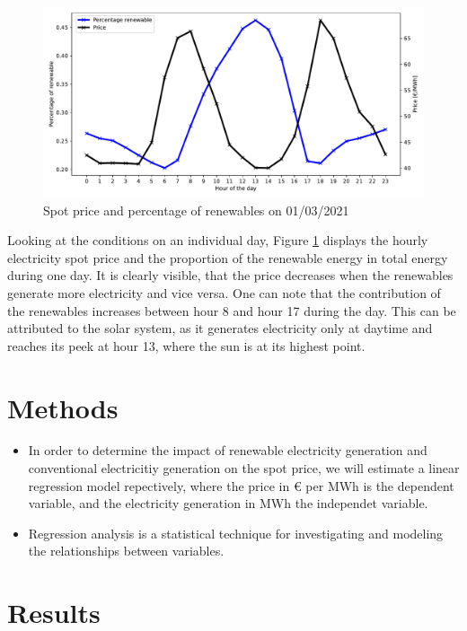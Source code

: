 \documentclass{article}
\begin{document}
\begin{figure}[h]
    \centering
    \includegraphics[width=0.8\columnwidth]{doc/fig/example_day.pdf}
    \caption{Spot price and percentage of renewables on 01/03/2021}
    \label{fig:example_day}
\end{figure}

Looking at the conditions on an individual day, Figure \ref{fig:example_day} displays the hourly electricity spot price and the proportion of the renewable energy in total energy during one day. 
It is clearly visible, that the price decreases when the renewables generate more electricity and vice versa. 
One can note that the contribution of the renewables increases between hour 8 and hour 17 during the day. 
This can be attributed to the solar system, as it generates electricity only at daytime and reaches its peek at hour 13, where the sun is at its highest point. 

\section{Methods}

\begin{itemize}
    \item In order to determine the impact of renewable electricity generation and conventional electricitiy generation on the spot price, we will estimate a linear regression model repectively, where the price in € per MWh is the dependent variable, and the electricity generation in MWh the independet variable. 
    \item Regression analysis is a statistical technique for investigating and modeling the relationships between variables. 
\end{itemize}


\section{Results}
\end{document}
